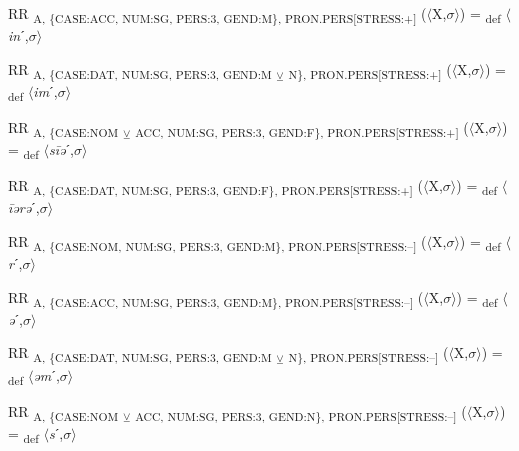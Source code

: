 {\begin{exe}
 RR \textsubscript{A, \{CASE:ACC, NUM:SG, PERS:3, GEND:M\}, PRON.PERS[STRESS:+]} ($\langle$X,$\sigma $$\rangle$) = \textsubscript{def} $\langle$\textit{in}ˊ,$\sigma $$\rangle$
\end{exe}

\begin{exe}
 RR \textsubscript{A, \{CASE:DAT, NUM:SG, PERS:3, GEND:M} \textsubscript{${\veebar}$}\textsubscript{ N\}, PRON.PERS[STRESS:+]} ($\langle$X,$\sigma $$\rangle$) = \textsubscript{def} $\langle$\textit{im}ˊ,$\sigma $$\rangle$
\end{exe}

\begin{exe}
 RR \textsubscript{A, \{CASE:NOM} \textsubscript{${\veebar}$}\textsubscript{ ACC, NUM:SG, PERS:3, GEND:F\}, PRON.PERS[STRESS:+]} ($\langle$X,$\sigma $$\rangle$) = \textsubscript{def} $\langle$\textit{s\=iə}ˊ,$\sigma $$\rangle$
\end{exe}

\begin{exe}
 RR \textsubscript{A, \{CASE:DAT, NUM:SG, PERS:3, GEND:F\}, PRON.PERS[STRESS:+]} ($\langle$X,$\sigma $$\rangle$) = \textsubscript{def} $\langle$\textit{\=iərə}ˊ,$\sigma $$\rangle$
\end{exe}

\begin{exe}
 RR \textsubscript{A, \{CASE:NOM, NUM:SG, PERS:3, GEND:M\}, PRON.PERS[STRESS:–]} ($\langle$X,$\sigma $$\rangle$) = \textsubscript{def} $\langle$\textit{r}ˊ,$\sigma $$\rangle$
\end{exe}

\begin{exe}
 RR \textsubscript{A, \{CASE:ACC, NUM:SG, PERS:3, GEND:M\}, PRON.PERS[STRESS:–]} ($\langle$X,$\sigma $$\rangle$) = \textsubscript{def} $\langle$\textit{ə}ˊ,$\sigma $$\rangle$
\end{exe}

\begin{exe}
 RR \textsubscript{A, \{CASE:DAT, NUM:SG, PERS:3, GEND:M} \textsubscript{${\veebar}$}\textsubscript{ N\}, PRON.PERS[STRESS:–]} ($\langle$X,$\sigma $$\rangle$) = \textsubscript{def} $\langle$\textit{əm}ˊ,$\sigma $$\rangle$
\end{exe}

\begin{exe}
 RR \textsubscript{A, \{CASE:NOM} \textsubscript{${\veebar}$}\textsubscript{ ACC, NUM:SG, PERS:3, GEND:N\}, PRON.PERS[STRESS:–]} ($\langle$X,$\sigma $$\rangle$) = \textsubscript{def} $\langle$\textit{s}ˊ,$\sigma $$\rangle$
\end{exe}

}
